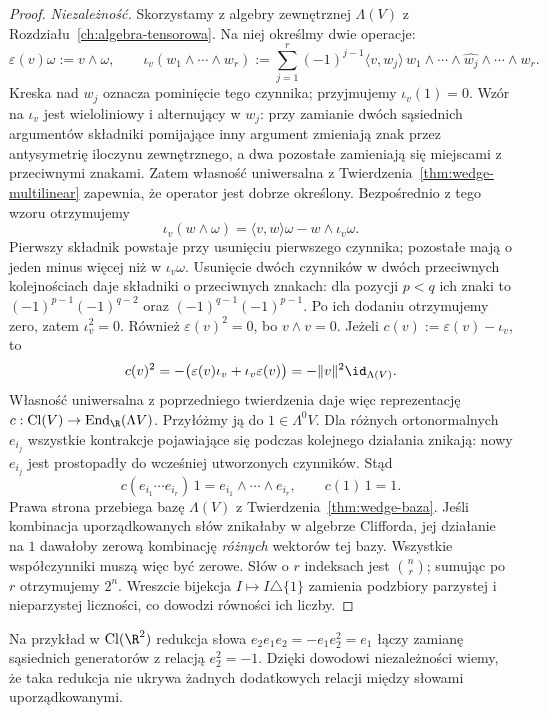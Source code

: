 \begin{proof}
\emph{Niezależność.} Skorzystamy z algebry zewnętrznej
$\Lambda(V)$ z Rozdziału~\ref{ch:algebra-tensorowa}.
Na niej określmy dwie operacje:
\[
 \varepsilon(v)\omega:=v\wedge\omega,\qquad
 \iota_v(w_1\wedge\cdots\wedge w_r)
 :=\sum_{j=1}^r(-1)^{j-1}
   \langle v,w_j\rangle\,
   w_1\wedge\cdots\wedge\widehat{w_j}
       \wedge\cdots\wedge w_r .
\]
Kreska nad $w_j$ oznacza pominięcie tego czynnika;
przyjmujemy $\iota_v(1)=0$.
Wzór na $\iota_v$ jest wieloliniowy i alternujący
w $w_j$: przy zamianie dwóch sąsiednich argumentów składniki
pomijające inny argument zmieniają znak przez antysymetrię iloczynu
zewnętrznego, a dwa pozostałe zamieniają się miejscami z przeciwnymi
znakami. Zatem własność uniwersalna
z Twierdzenia~\ref{thm:wedge-multilinear}
zapewnia, że operator jest dobrze określony.
Bezpośrednio z tego wzoru otrzymujemy
\[
 \iota_v(w\wedge\omega)
  =\langle v,w\rangle\omega-w\wedge\iota_v\omega.
\]
Pierwszy składnik powstaje przy usunięciu pierwszego
czynnika; pozostałe mają o jeden minus więcej niż
w $\iota_v\omega$. Usunięcie dwóch czynników
w dwóch przeciwnych kolejnościach daje składniki
o przeciwnych znakach: dla pozycji $p<q$ ich znaki to
$(-1)^{p-1}(-1)^{q-2}$ oraz
$(-1)^{q-1}(-1)^{p-1}$. Po ich dodaniu
otrzymujemy zero, zatem $\iota_v^2=0$.
Również $\varepsilon(v)^2=0$, bo $v\wedge v=0$.
Jeżeli $c(v):=\varepsilon(v)-\iota_v$, to
\[
 c(v)^2
 =-\bigl(\varepsilon(v)\iota_v
          +\iota_v\varepsilon(v)\bigr)
 =-\|v\|^2\id_{\Lambda(V)}.
\]
Własność uniwersalna z poprzedniego twierdzenia
daje więc reprezentację
$c:\operatorname{Cl}(V)\to\operatorname{End}_\R(\Lambda V)$.
Przyłóżmy ją do $1\in\Lambda^0V$.
Dla różnych ortonormalnych $e_{i_j}$ wszystkie
kontrakcje pojawiające się podczas kolejnego
działania znikają: nowy $e_{i_j}$ jest prostopadły
do wcześniej utworzonych czynników. Stąd
\[
 c(e_{i_1}\cdots e_{i_r})\,1
    =e_{i_1}\wedge\cdots\wedge e_{i_r},\qquad
 c(1)\,1=1.
\]
Prawa strona przebiega bazę $\Lambda(V)$ z
Twierdzenia~\ref{thm:wedge-baza}. Jeśli kombinacja
uporządkowanych słów znikałaby w algebrze Clifforda,
jej działanie na $1$ dawałoby zerową kombinację
\emph{różnych} wektorów tej bazy. Wszystkie
współczynniki muszą więc być zerowe.
Słów o $r$ indeksach jest $\binom nr$;
sumując po $r$ otrzymujemy $2^n$.
Wreszcie bijekcja $I\mapsto I\triangle\{1\}$
zamienia podzbiory parzystej i nieparzystej
liczności, co dowodzi równości ich liczby.
\end{proof}

Na przykład w $\operatorname{Cl}(\R^2)$ redukcja słowa
$e_2e_1e_2=-e_1e_2^2=e_1$ łączy zamianę sąsiednich
generatorów z relacją $e_2^2=-1$. Dzięki dowodowi
niezależności wiemy, że taka redukcja nie ukrywa
żadnych dodatkowych relacji między słowami uporządkowanymi.

